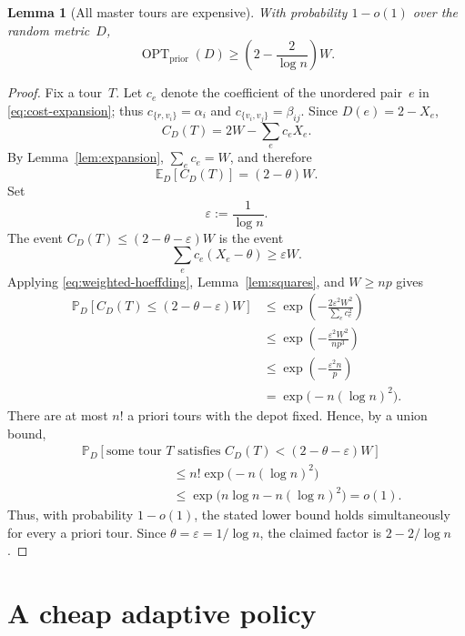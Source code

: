 \documentclass[11pt]{article}
\newtheorem{lemma}[theorem]{Lemma}
\theoremstyle{remark}
\newcommand{\E}{\mathbb{E}}
\newcommand{\Prob}{\mathbb{P}}
\newcommand{\optprior}{\operatorname{OPT}_{\mathrm{prior}}}
\begin{document}
\begin{lemma}[All master tours are expensive]\label{lem:all-tours}
With probability $1-o(1)$ over the random metric~$D$,
\[
    \optprior(D)
    \geq
    \left(2-\frac{2}{\log n}\right)W.
\]
\end{lemma}

\begin{proof}
Fix a tour~$T$.  Let $c_e$ denote the coefficient of the unordered pair~$e$ in
\eqref{eq:cost-expansion}; thus $c_{\{r,v_i\}}=\alpha_i$ and
$c_{\{v_i,v_j\}}=\beta_{ij}$.  Since $D(e)=2-X_e$,
\[
    C_D(T)=2W-\sum_e c_eX_e.
\]
By Lemma~\ref{lem:expansion}, $\sum_e c_e=W$, and therefore
\[
    \E_D[C_D(T)]=(2-\theta)W.
\]
Set
\[
    \varepsilon:=\frac{1}{\log n}.
\]
The event
$C_D(T)\leq(2-\theta-\varepsilon)W$ is the event
\[
    \sum_e c_e(X_e-\theta)\geq\varepsilon W.
\]
Applying \eqref{eq:weighted-hoeffding}, Lemma~\ref{lem:squares}, and
$W\geq np$ gives
\begin{align*}
    \Prob_D\!\left[
        C_D(T)\leq(2-\theta-\varepsilon)W
    \right]
    &\leq
    \exp\!\left(
        -\frac{2\varepsilon^2W^2}{\sum_e c_e^2}
    \right)\\
    &\leq
    \exp\!\left(-\frac{\varepsilon^2W^2}{np^3}\right)\\
    &\leq
    \exp\!\left(-\frac{\varepsilon^2n}{p}\right)\\
    &=\exp\!\bigl(-n(\log n)^2\bigr).
\end{align*}
There are at most $n!$ a priori tours with the depot fixed.  Hence, by a union
bound,
\begin{align*}
    &\Prob_D\!\left[
        \text{some tour }T\text{ satisfies }
        C_D(T)<(2-\theta-\varepsilon)W
    \right]\\
    &\hspace{3cm}\leq
    n!\exp\!\bigl(-n(\log n)^2\bigr)\\
    &\hspace{3cm}\leq
    \exp\!\bigl(n\log n-n(\log n)^2\bigr)
    =o(1).
\end{align*}
Thus, with probability $1-o(1)$, the stated lower bound holds simultaneously
for every a priori tour.  Since $\theta=\varepsilon=1/\log n$, the claimed
factor is $2-2/\log n$.
\end{proof}

\section{A cheap adaptive policy}
\end{document}
